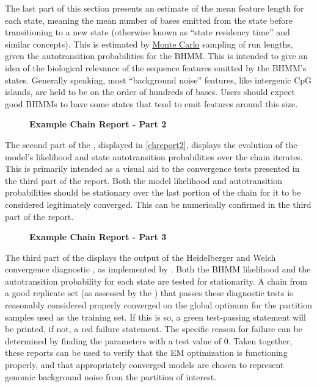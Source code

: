 The last part of this section presents an estimate of the mean feature length for each state, meaning the mean number of bases emitted from the state before transitioning to a new state (otherwise known as ``state residency time'' and similar concepts). This is estimated by \hyperref[ssec:MonteCarlo]{Monte Carlo} sampling of run lengths, given the autotransition probabilities for the BHMM. This is intended to give an idea of the biological relevance of the sequence features emitted by the BHMM's states. Generally speaking, most ``background noise'' features, like intergenic CpG islands, are held to be on the order of hundreds of bases. Users should expect good BHMMs to have some states that tend to emit features around this size.

\begin{figure}[!h]
    \caption{{\bf Example \protect{} Chain Report - Part 2}}
    \label{chreport2}
\end{figure}

The second part of the , displayed in \autoref{chreport2}, displays the evolution of the model's likelihood and state autotransition probabilities over the chain iterates. This is primarily intended as a visual aid to the convergence tests presented in the third part of the report. Both the model likelihood and autotransition probabilities should be stationary over the last portion of the chain for it to be considered legitimately converged. This can be numerically confirmed in the third part of the report.

\begin{figure}[!h]
    \caption{{\bf Example \protect{} Chain Report - Part 3}}
    \label{chreport3}
\end{figure}

The third part of the  displays the output of the Heidelberger and Welch convergence diagnostic \cite{Heidelberger1981}, as implemented by  \cite{Pfiffer2020}. Both the BHMM likelihood and the autotransition probability for each state are tested for stationarity. A chain from a good replicate set (as assessed by the ) that passes these diagnostic tests is reasonably considered properly converged on the global optimum for the partition samples used as the training set. If this is so, a green test-passing statement will be printed, if not, a red failure statement. The specific reason for failure can be determined by finding the parameters with a test value of 0. Taken together, these reports can be used to verify that the EM optimization is functioning properly, and that appropriately converged models are chosen to represent genomic background noise from the partition of interest.